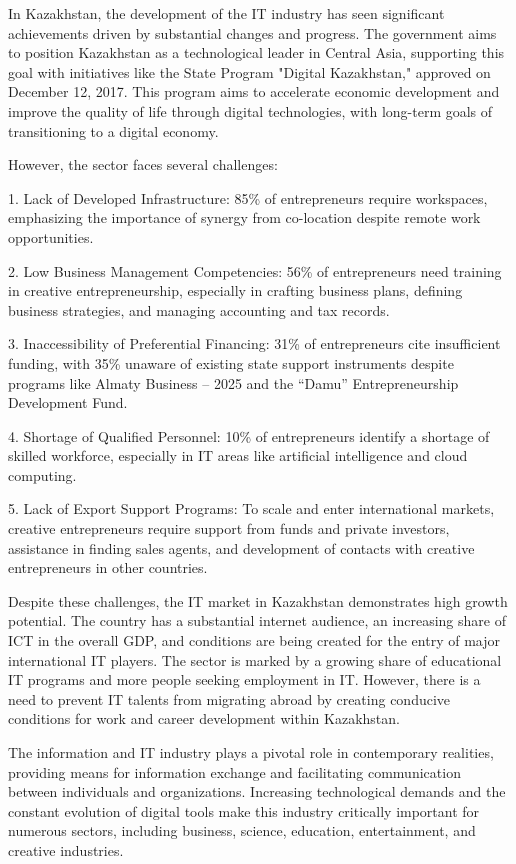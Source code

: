 In Kazakhstan, the development of the IT industry has seen significant
achievements driven by substantial changes and progress. The government
aims to position Kazakhstan as a technological leader in Central Asia,
supporting this goal with initiatives like the State Program "Digital
Kazakhstan," approved on December 12, 2017. This program aims to
accelerate economic development and improve the quality of life through
digital technologies, with long-term goals of transitioning to a digital
economy.

However, the sector faces several challenges:

1. Lack of Developed Infrastructure: 85\% of entrepreneurs require
workspaces, emphasizing the importance of synergy from co-location
despite remote work opportunities.

2. Low Business Management Competencies: 56\% of entrepreneurs need
training in creative entrepreneurship, especially in crafting business
plans, defining business strategies, and managing accounting and tax
records.

3. Inaccessibility of Preferential Financing: 31\% of entrepreneurs cite
insufficient funding, with 35\% unaware of existing state support
instruments despite programs like Almaty Business -- 2025 and the
``Damu'' Entrepreneurship Development Fund.

4. Shortage of Qualified Personnel: 10\% of entrepreneurs identify a
shortage of skilled workforce, especially in IT areas like artificial
intelligence and cloud computing.

5. Lack of Export Support Programs: To scale and enter international
markets, creative entrepreneurs require support from funds and private
investors, assistance in finding sales agents, and development of
contacts with creative entrepreneurs in other countries.

Despite these challenges, the IT market in Kazakhstan demonstrates high
growth potential. The country has a substantial internet audience, an
increasing share of ICT in the overall GDP, and conditions are being
created for the entry of major international IT players. The sector is
marked by a growing share of educational IT programs and more people
seeking employment in IT. However, there is a need to prevent IT talents
from migrating abroad by creating conducive conditions for work and
career development within Kazakhstan.

The information and IT industry plays a pivotal role in contemporary
realities, providing means for information exchange and facilitating
communication between individuals and organizations. Increasing
technological demands and the constant evolution of digital tools make
this industry critically important for numerous sectors, including
business, science, education, entertainment, and creative industries.

